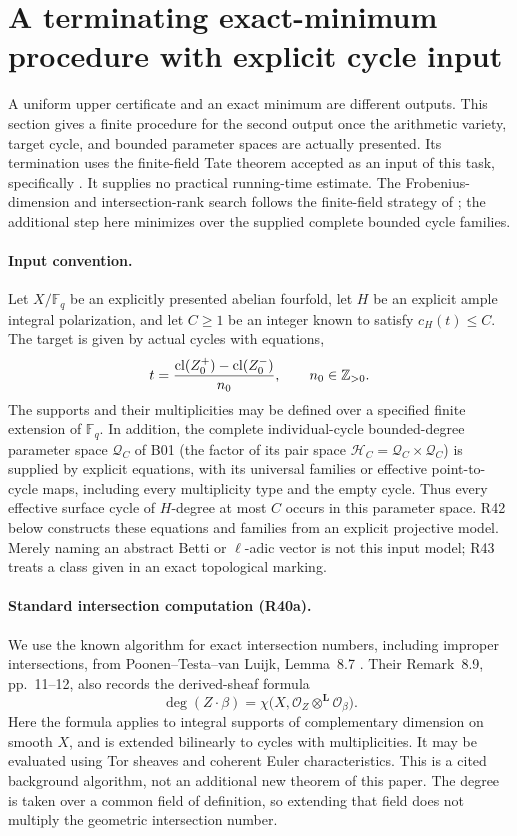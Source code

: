 \section{A terminating exact-minimum procedure with explicit cycle input}
\label{sec:exact-algorithm}

A uniform upper certificate and an exact minimum are different outputs.
This section gives a finite procedure for the second output once the
arithmetic variety, target cycle, and bounded parameter spaces are
actually presented. Its termination uses the finite-field Tate theorem
accepted as an input of this task, specifically
\cite[Theorem 3.1 and \S3.2]{MilneReport2026}. It supplies no practical
running-time estimate. The Frobenius-dimension and intersection-rank
search follows the finite-field strategy of
\cite[Theorem 8.36, author PDF p.~19]{PoonenTestaVanLuijk}; the additional
step here minimizes over the supplied complete bounded cycle families.

\paragraph{Input convention.}
Let $X/\mathbb F_q$ be an explicitly presented abelian fourfold, let
$H$ be an explicit ample integral polarization, and let $C\geq1$ be an
integer known to satisfy $c_H(t)\leq C$. The target is given by actual
cycles with equations,
\[
             t=\frac{\operatorname{cl}(Z_0^+)-\operatorname{cl}(Z_0^-)}{n_0},
             \qquad n_0\in\mathbb Z_{>0}.
\]
The supports and their multiplicities may be defined over a specified
finite extension of $\mathbb F_q$. In addition, the complete
individual-cycle bounded-degree parameter space $\mathcal Q_C$ of B01
(the factor of its pair space $\mathcal H_C=\mathcal Q_C\times\mathcal Q_C$) is supplied by
explicit equations, with its universal families or effective
point-to-cycle maps, including every multiplicity type and the empty
cycle. Thus every effective surface cycle of $H$-degree at most $C$
occurs in this parameter space. R42 below constructs these equations
and families from an explicit projective model. Merely naming an
abstract Betti or $\ell$-adic vector is not this input model; R43 treats
a class given in an exact topological marking.

\paragraph{Standard intersection computation (R40a).}
We use the known algorithm for exact intersection numbers, including
improper intersections, from Poonen--Testa--van Luijk,
Lemma~8.7 \cite[author PDF p.~11]{PoonenTestaVanLuijk}.
Their Remark~8.9, pp.~11--12, also records the derived-sheaf formula
\[
 \deg(Z\cdot\beta)
 =\chi\bigl(X,\mathcal O_Z\mathbin{\otimes^{\mathbf L}}
                         \mathcal O_\beta\bigr).
\]
Here the formula applies to integral supports of complementary
dimension on smooth $X$, and is extended bilinearly to cycles with
multiplicities. It may be evaluated using Tor sheaves and coherent
Euler characteristics. This is a cited background algorithm, not an
additional new theorem of this paper. The degree is taken over a common field
of definition, so extending that field does not multiply the geometric
intersection number.

